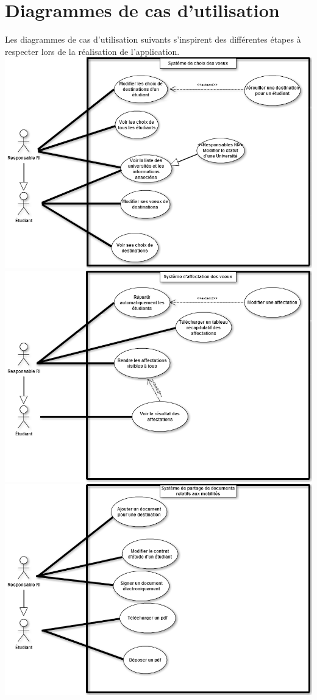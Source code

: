 \section{Diagrammes de cas d'utilisation}

Les diagrammes de cas d'utilisation suivants s'inspirent des différentes étapes à respecter lors de la réalisation de l'application.
\newline
\includegraphics[scale=0.5]{Projet/useCaseDiag/choixvoeux.png}
\newline
\includegraphics[scale=0.5]{Projet/useCaseDiag/affectations.png}
\newline
\includegraphics[scale=0.5]{Projet/useCaseDiag/documents.png}
